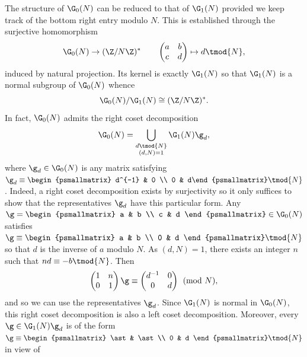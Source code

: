 \documentclass[12pt]{article}
\begin{document}
        The structure of \(\G_{0}(N)\) can be reduced to that of \(\G_{1}(N)\) provided we keep track of the bottom right entry modulo \(N\). This is established through the surjective homomorphism
        \[
          \G_{0}(N) \to (\Z/N\Z)^{\ast} \qquad \begin{pmatrix} a & b \\ c & d\end{pmatrix} \mapsto d \tmod{N},
        \]
        induced by natural projection. Its kernel is exactly \(\G_{1}(N)\) so that \(\G_{1}(N)\) is a normal subgroup of \(\G_{0}(N)\) whence
        \[
          \G_{0}(N)/\G_{1}(N) \cong (\Z/N\Z)^{\ast}.
        \]
        In fact, \(\G_{0}(N)\) admits the right coset decomposition
        \begin{equation}\label{equ:right_coset_decomposition_for_Hecke_congreunce_subgroup}
          \G_{0}(N) = \bigcup_{\substack{d \tmod{N} \\ (d,N) = 1}}\G_{1}(N)\g_{d},
        \end{equation}
        where \(\g_{d} \in \G_{0}(N)\) is any matrix satisfying \(\g_{d} \equiv \begin{psmallmatrix} d^{-1} & 0 \\ 0 & d\end{psmallmatrix} \tmod{N}\). Indeed, a right coset decomposition exists by surjectivity so it only suffices to show that the representatives \(\g_{d}\) have this particular form. Any \(\g = \begin{psmallmatrix} a & b \\ c & d \end{psmallmatrix} \in \G_{0}(N)\) satisfies \(\g \equiv \begin{psmallmatrix} a & b \\ 0 & d \end{psmallmatrix} \tmod{N}\) so that \(d\) is the inverse of \(a\) modulo \(N\). As \((d,N) = 1\), there exists an integer \(n\) such that \(nd \equiv -b \tmod{N}\). Then
        \[
          \begin{pmatrix} 1 & n \\ 0 & 1 \end{pmatrix}\g \equiv \begin{pmatrix} d^{-1} & 0 \\ 0 & d \end{pmatrix} \pmod{N},
        \]
        and so we can use the representatives \(\g_{d}\). Since \(\G_{1}(N)\) is normal in \(\G_{0}(N)\), this right coset decomposition is also a left coset decomposition. Moreover, every \(\g \in \G_{1}(N)\g_{d}\) is of the form \(\g \equiv \begin{psmallmatrix} \ast & \ast \\ 0 & d \end{psmallmatrix} \tmod{N}\) in view of
\end{document}
